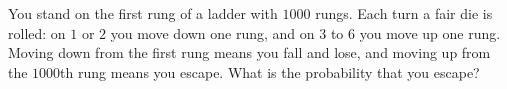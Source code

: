 You stand on the first rung of a ladder with $1000$ rungs. Each turn a fair die is rolled: on $1$ or $2$ you move down one rung, and on $3$ to $6$ you move up one rung. Moving down from the first rung means you fall and lose, and moving up from the $1000$th rung means you escape. What is the probability that you escape?
